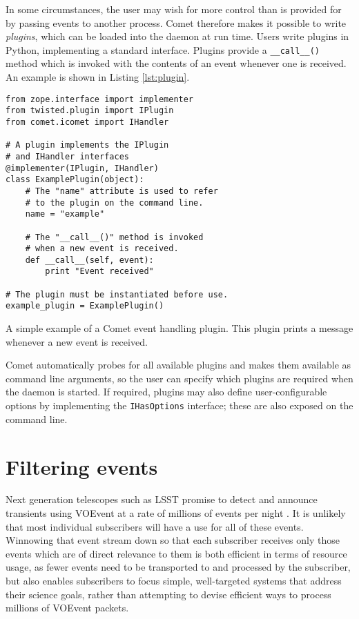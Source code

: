 \documentclass[5p,authoryear]{elsarticle}
\begin{document}
In some circumstances, the user may wish for more control than is provided for
by passing events to another process. Comet therefore makes it possible to
write \textit{plugins}, which can be loaded into the daemon at run time.
Users write plugins in Python, implementing a standard interface. Plugins
provide a \texttt{\_\_call\_\_()} method which is invoked with the contents of
an event whenever one is received. An example is shown in Listing
\ref{lst:plugin}.

\begin{listing}[H]
\begin{verbatim}
from zope.interface import implementer
from twisted.plugin import IPlugin
from comet.icomet import IHandler

# A plugin implements the IPlugin
# and IHandler interfaces
@implementer(IPlugin, IHandler)
class ExamplePlugin(object):
    # The "name" attribute is used to refer
    # to the plugin on the command line.
    name = "example"

    # The "__call__()" method is invoked
    # when a new event is received.
    def __call__(self, event):
        print "Event received"

# The plugin must be instantiated before use.
example_plugin = ExamplePlugin()
\end{verbatim}
\caption{A simple example of a Comet event handling plugin. This plugin prints
a message whenever a new event is received.}
\label{lst:plugin}
\end{listing}

Comet automatically probes for all available plugins and makes them available
as command line arguments, so the user can specify which plugins are required
when the daemon is started. If required, plugins may also define
user-configurable options by implementing the \texttt{IHasOptions} interface;
these are also exposed on the command line.

\section{Filtering events}
\label{sec:filter}

Next generation telescopes such as LSST promise to detect and announce
transients using VOEvent at a rate of millions of events per night
\citep{Kantor:2014}. It is unlikely that most individual subscribers will have
a use for all of these events. Winnowing that event stream down so that each
subscriber receives only those events which are of direct relevance to them is
both efficient in terms of resource usage, as fewer events need to be
transported to and processed by the subscriber, but also enables subscribers
to focus simple, well-targeted systems that address their science goals,
rather than attempting to devise efficient ways to process millions of VOEvent
packets.
\end{document}
